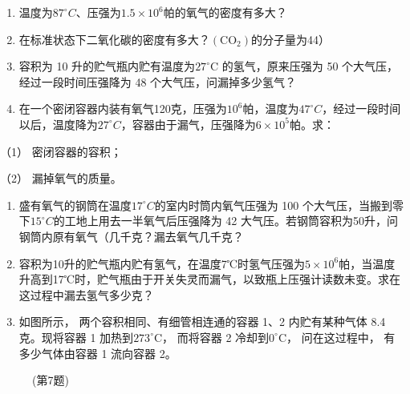 \begin{enumerate}
\def\labelenumi{\arabic{enumi}.}
\item
  温度为\(87^{\circ}C\)、压强为\(1.5 \times 10^{6}\)帕的氧气的密度有多大？
\item
  在标准状态下二氧化碳的密度有多大？\(\left(\mathrm{CO}_{2}\right)\)的分子量为44）
\item
  容积为 10 升的贮气瓶内贮有温度为\(27^{\circ}\)C 的氢气，原来压强为 50
  个大气压，经过一段时间压强降为 48 个大气压，问漏掉多少氢气？
\item
  在一个密闭容器内装有氧气120克，压强为\(10^{6}\)帕，温度为\(47^{\circ}C\)，经过一段时间以后，温度降为\(27^{\circ}C\)，容器由于漏气，压强降为\(6\times10^{5}\)帕。求：
\end{enumerate}

（1） 密闭容器的容积；

（2） 漏掉氧气的质量。

\begin{enumerate}
\def\labelenumi{\arabic{enumi}.}
\setcounter{enumi}{4}
\item
  盛有氧气的钢筒在温度\(17^{\circ}C\)的室内时筒内氧气压强为 100
  个大气压，当搬到零下\(15^{\circ}C\)的工地上用去一半氧气后压强降为 42
  大气压。若钢筒容积为50升，问钢筒内原有氧气（几千克？漏去氧气几千克？
\item
  容积为10升的贮气瓶内贮有氢气，在温度7℃时氢气压强为\(5\times10^{6}\)帕，当温度升高到17℃时，贮气瓶由于开关失灵而漏气，以致瓶上压强计读数未变。求在这过程中漏去氢气多少克？
\item
  如图所示， 两个容积相同、有细管相连通的容器 1、2 内贮有某种气体 8.4
  克。现将容器 1 加热到\(273^{\circ} \mathrm{C}\)， 而将容器 2
  冷却到\(0^{\circ} \mathrm{C}\)， 问在这过程中， 有多少气体由容器 1
  流向容器 2。
\end{enumerate}

\begin{figure}
\centering
{}
\caption{(第7题)}
\end{figure}

